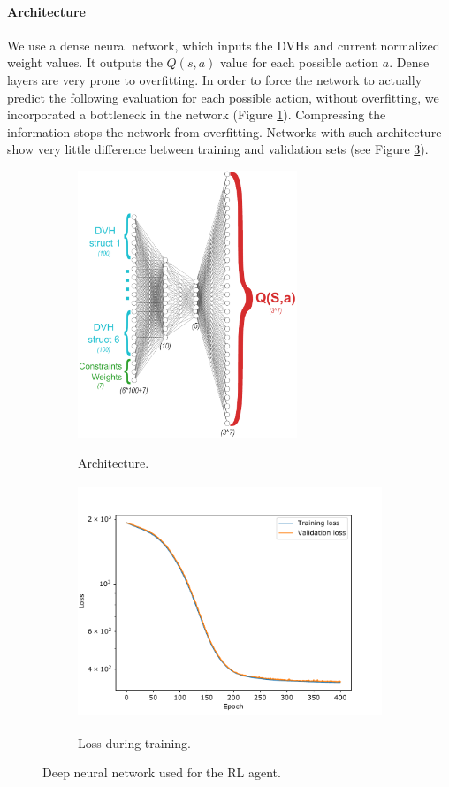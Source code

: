 \paragraph{Architecture}
We use a dense neural network, which inputs the DVHs and current normalized weight values.
It outputs the $Q(s, a)$ value for each possible action $a$.
Dense layers are very prone to overfitting.
In order to force the network to actually predict the following evaluation for each possible action, without overfitting, we incorporated a bottleneck in the network (Figure \ref{fig:architecture}).
Compressing the information stops the network from overfitting.
Networks with such architecture show very little difference between training and validation sets (see Figure \ref{fig:losses_training}).

\begin{figure}
	\centering
	\begin{subfigure}{0.48\linewidth}
		\centering
		\includegraphics[height=8cm]{AIME/architecture_all_actions.pdf}
		\label{fig:architecture}
		\caption{Architecture.}
	\end{subfigure}
	\begin{subfigure}{0.48\linewidth}
		\centering
		\includegraphics[height=7cm]{AIME/losses-distance.pdf}
		\label{fig:losses_training}
		\caption{Loss during training.}
	\end{subfigure}
	\caption{Deep neural network used for the RL agent.}
\end{figure}

